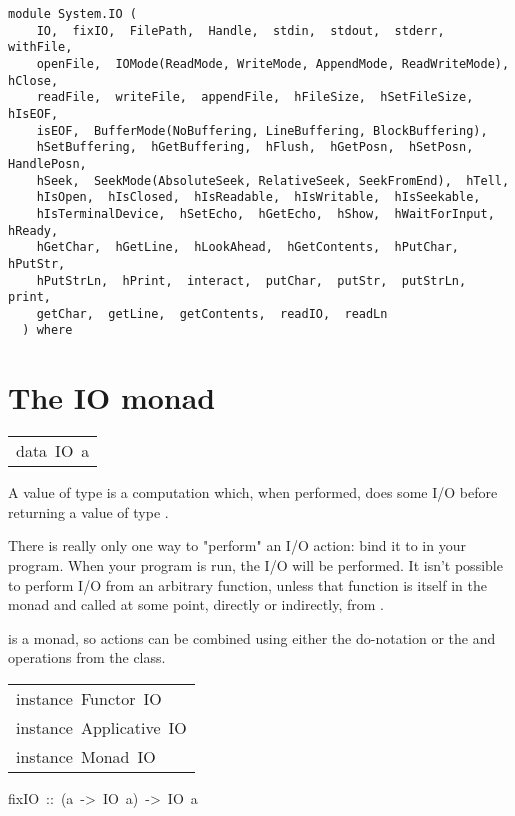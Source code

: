 \label{module:System.IO}
\haddockbeginheader
{\haddockverb\begin{verbatim}
module System.IO (
    IO,  fixIO,  FilePath,  Handle,  stdin,  stdout,  stderr,  withFile, 
    openFile,  IOMode(ReadMode, WriteMode, AppendMode, ReadWriteMode),  hClose, 
    readFile,  writeFile,  appendFile,  hFileSize,  hSetFileSize,  hIsEOF, 
    isEOF,  BufferMode(NoBuffering, LineBuffering, BlockBuffering), 
    hSetBuffering,  hGetBuffering,  hFlush,  hGetPosn,  hSetPosn,  HandlePosn, 
    hSeek,  SeekMode(AbsoluteSeek, RelativeSeek, SeekFromEnd),  hTell, 
    hIsOpen,  hIsClosed,  hIsReadable,  hIsWritable,  hIsSeekable, 
    hIsTerminalDevice,  hSetEcho,  hGetEcho,  hShow,  hWaitForInput,  hReady, 
    hGetChar,  hGetLine,  hLookAhead,  hGetContents,  hPutChar,  hPutStr, 
    hPutStrLn,  hPrint,  interact,  putChar,  putStr,  putStrLn,  print, 
    getChar,  getLine,  getContents,  readIO,  readLn
  ) where\end{verbatim}}
\haddockendheader

\section{The IO monad
}
\begin{haddockdesc}
\item[\begin{tabular}{@{}l}
data\ IO\ a
\end{tabular}]\haddockbegindoc
A value of type  is a computation which, when performed,
does some I/O before returning a value of type .
\par
There is really only one way to "perform" an I/O action: bind it to
 in your program.  When your program is run, the I/O will
be performed.  It isn't possible to perform I/O from an arbitrary
function, unless that function is itself in the  monad and called
at some point, directly or indirectly, from .
\par
{} is a monad, so  actions can be combined using either the do-notation
or the \haddocktt{>>} and \haddocktt{>>=} operations from the  class.
\par

\end{haddockdesc}
\begin{haddockdesc}
\item[\begin{tabular}{@{}l}
instance\ Functor\ IO\\instance\ Applicative\ IO\\instance\ Monad\ IO
\end{tabular}]
\end{haddockdesc}
\begin{haddockdesc}
\item[
fixIO\ ::\ (a\ ->\ IO\ a)\ ->\ IO\ a
]
\end{haddockdesc}
